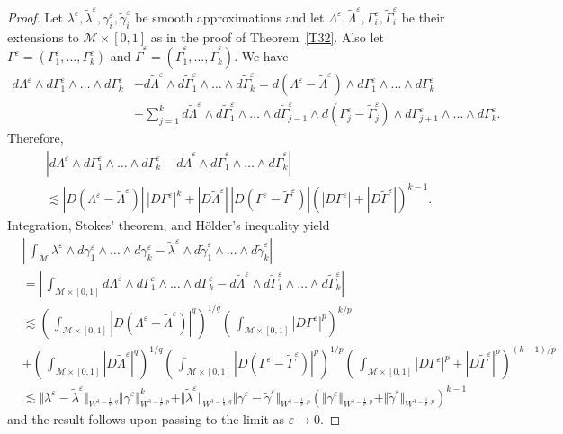 \documentclass[intlimits,12pt,reqno]{amsart}
\newcommand{\cM}{\mathcal M}
\newcommand{\eps}{\varepsilon}
\numberwithin{equation}{section}
\theoremstyle{definition}
\begin{document}
\begin{proof}
Let $\lambda^\eps,\tilde{\lambda}^\eps,\gamma_i^\eps,\tilde{\gamma}_i^\eps$ be smooth approximations and let
$\Lambda^\eps,\tilde{\Lambda}^\eps,\Gamma_i^\eps,\tilde{\Gamma}_i^\eps$ be their extensions to $\cM\times [0,1]$ as in the proof of Theorem~\ref{T32}. Also let $\Gamma^\eps=(\Gamma_1^\eps,\ldots,\Gamma_k^\eps)$ and 
$\tilde{\Gamma}^\eps=(\tilde{\Gamma}_1^\eps,\ldots,\tilde{\Gamma}_k^\eps)$. We have
\begin{align*}
d\Lambda^\eps\wedge d\Gamma_1^\eps\wedge\ldots\wedge d\Gamma_k^\eps
&-
d\tilde{\Lambda}^\eps\wedge d\tilde{\Gamma}_1^\eps\wedge\ldots\wedge
d\tilde{\Gamma}_k^\eps    
=
d(\Lambda^\eps-\tilde{\Lambda}^\eps)\wedge d\Gamma_1^\eps\wedge\ldots\wedge d\Gamma_k^\eps\\
&+
\sum_{j=1}^k d\tilde{\Lambda}^\eps\wedge d\tilde{\Gamma}_1^\eps\wedge\ldots\wedge d\tilde{\Gamma}_{j-1}^\eps\wedge d(\Gamma_j^\eps-\tilde{\Gamma}_j^\eps)\wedge d{\Gamma}_{j+1}^\eps\wedge\ldots\wedge d{\Gamma}_k^\eps.
\end{align*}
Therefore,
\begin{equation}
\label{eq92}
\begin{split}
&|d\Lambda^\eps\wedge d\Gamma_1^\eps\wedge\ldots\wedge d\Gamma_k^\eps-
d\tilde{\Lambda}^\eps\wedge d\tilde{\Gamma}_1^\eps\wedge\ldots\wedge
d\tilde{\Gamma}_k^\eps|\\
&\lesssim 
|D(\Lambda^\eps-\tilde{\Lambda}^\eps)|\, |D\Gamma^\eps|^k+
|D\tilde{\Lambda}^\eps|\, |D(\Gamma^\eps-\tilde{\Gamma}^\eps)|(|D \Gamma^\eps|+|D\tilde{\Gamma}^\eps|)^{k-1}.
\end{split}
\end{equation}
Integration, Stokes' theorem, and H\"older's inequality yield
\begin{align*}
&
\left|\,\int_{\cM}\lambda^\eps\wedge d\gamma^\eps_1\wedge\ldots\wedge d\gamma^\eps_k-
\tilde{\lambda}^\eps\wedge d\tilde{\gamma}^\eps_1\wedge\ldots\wedge d\tilde{\gamma}^\eps_k\right|\\
&=
\left|\, \int_{\cM\times [0,1]}d\Lambda^\eps\wedge d\Gamma_1^\eps\wedge\ldots\wedge d\Gamma_k^\eps-
d\tilde{\Lambda}^\eps\wedge d\tilde{\Gamma}_1^\eps\wedge\ldots\wedge
d\tilde{\Gamma}_k^\eps\right|\\
&\lesssim
\left(\,\int_{\cM\times [0,1]}|D(\Lambda^\eps-\tilde{\Lambda}^\eps)|^q\right)^{1/q}
\left(\,\int_{\cM\times [0,1]}|D\Gamma^\eps|^p\right)^{k/p}\\
&+
\left(\,\int_{\cM\times [0,1]}|D\tilde{\Lambda}^\eps|^q\right)^{1/q}
\left(\,\int_{\cM\times [0,1]}|D(\Gamma^\eps-\tilde{\Gamma}^\eps)|^p\right)^{1/p}
\left(\,\int_{\cM\times [0,1]}|D\Gamma^\eps|^p+|D\tilde{\Gamma}^\eps|^p\right)^{(k-1)/p}\\
&\lesssim
\Vert\lambda^\eps-\tilde{\lambda}^\eps\Vert_{W^{1-\frac{1}{q},q}}
\Vert \gamma^\eps\Vert_{W^{1-\frac{1}{p},p}}^k
+
\Vert\tilde{\lambda}^\eps\Vert_{W^{1-\frac{1}{q},q}}
\Vert \gamma^\eps-\tilde{\gamma}^\eps\Vert_{W^{1-\frac{1}{p},p}}
\left(\Vert \gamma^\eps\Vert_{W^{1-\frac{1}{p},p}}+\Vert \tilde{\gamma}^\eps\Vert_{W^{1-\frac{1}{p},p}}\right)^{k-1}
\end{align*}
and the result follows upon passing to the limit as $\eps\to 0$.
\end{proof}
\end{document}
